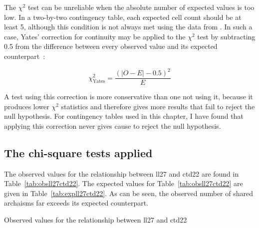 
The \(\chi^2\) test can be unreliable when the absolute number of expected values is too low. In a two-by-two contingency table, each expected cell count should be at least 5, although this condition is not always met using the data from . In such a case, Yates' correction for continuity may be applied to the \(\chi^2\) test by subtracting 0.5 from the difference between every observed value and its expected counterpart~\autocite[222]{Yat_Contingency34}:

\[\chi_\text{Yates}^2 =  \frac{(|O - E| - 0.5)^2}{E}\]

A test using this correction is more conservative than one not using it, because it produces lower \(\chi^2\) statistics and therefore gives more results that fail to reject the null hypothesis. For contingency tables used in this chapter, I have found that applying this correction never gives cause to reject the null hypothesis.

\subsection{The chi-square tests applied}
\label{sec:chisqapplied}

The observed values for the relationship between \gls{ll27} and \gls{ctd22} are found in Table~\ref{tab:obsll27ctd22}. 
The expected values for Table~\ref{tab:obsll27ctd22} are given in Table~\ref{tab:expll27ctd22}. As can be seen, the observed number of shared archaisms far exceeds its expected counterpart.

\begin{table}[h]
  \centering
  \caption{Observed values for the relationship between \acrshort{ll27} and \acrshort{ctd22}}
  \label{tab:obsll27ctd22}
  
\end{table}


